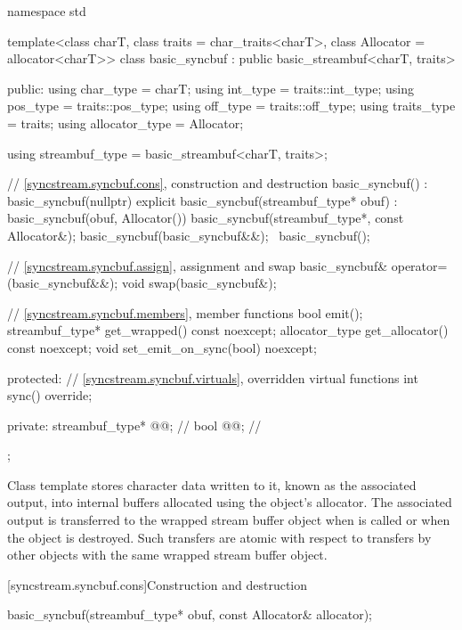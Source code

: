 %
\begin{codeblock}
namespace std {
  template<class charT, class traits = char_traits<charT>, class Allocator = allocator<charT>>
  class basic_syncbuf : public basic_streambuf<charT, traits> {
  public:
    using char_type      = charT;
    using int_type       = traits::int_type;
    using pos_type       = traits::pos_type;
    using off_type       = traits::off_type;
    using traits_type    = traits;
    using allocator_type = Allocator;

    using streambuf_type = basic_streambuf<charT, traits>;

    // \ref{syncstream.syncbuf.cons}, construction and destruction
    basic_syncbuf()
      : basic_syncbuf(nullptr) {}
    explicit basic_syncbuf(streambuf_type* obuf)
      : basic_syncbuf(obuf, Allocator()) {}
    basic_syncbuf(streambuf_type*, const Allocator&);
    basic_syncbuf(basic_syncbuf&&);
    ~basic_syncbuf();

    // \ref{syncstream.syncbuf.assign}, assignment and swap
    basic_syncbuf& operator=(basic_syncbuf&&);
    void swap(basic_syncbuf&);

    // \ref{syncstream.syncbuf.members}, member functions
    bool emit();
    streambuf_type* get_wrapped() const noexcept;
    allocator_type get_allocator() const noexcept;
    void set_emit_on_sync(bool) noexcept;

  protected:
    // \ref{syncstream.syncbuf.virtuals}, overridden virtual functions
    int sync() override;

  private:
    streambuf_type* @@;    // \expos
    bool @@{};        // \expos
  };
}
\end{codeblock}

\pnum
Class template  stores character data
written to it, known as the associated output, into internal
buffers allocated using the object's allocator.
The associated output is transferred to the
wrapped stream buffer object 
when  is called
or when the  object is destroyed.
Such transfers are atomic with respect to transfers
by other  objects
with the same wrapped stream buffer object.

[syncstream.syncbuf.cons]{Construction and destruction}

%
\begin{itemdecl}
basic_syncbuf(streambuf_type* obuf, const Allocator& allocator);
\end{itemdecl}

